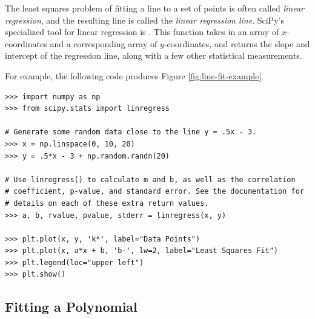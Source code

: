 \begin{info} %
The least squares problem of fitting a line to a set of points is often called \emph{linear regression}, and the resulting line is called the \emph{linear regression line}.
SciPy's specialized tool for linear regression is .
This function takes in an array of $x$-coordinates and a corresponding array of $y$-coordinates, and returns the slope and intercept of the regression line, along with a few other statistical measurements.

For example, the following code produces Figure \ref{fig:line-fit-example}.

\begin{lstlisting}
>>> import numpy as np
>>> from scipy.stats import linregress

# Generate some random data close to the line y = .5x - 3.
>>> x = np.linspace(0, 10, 20)
>>> y = .5*x - 3 + np.random.randn(20)

# Use linregress() to calculate m and b, as well as the correlation
# coefficient, p-value, and standard error. See the documentation for
# details on each of these extra return values.
>>> a, b, rvalue, pvalue, stderr = linregress(x, y)

>>> plt.plot(x, y, 'k*', label="Data Points")
>>> plt.plot(x, a*x + b, 'b-', lw=2, label="Least Squares Fit")
>>> plt.legend(loc="upper left")
>>> plt.show()
\end{lstlisting}
\end{info}

\subsection*{Fitting a Polynomial} %

